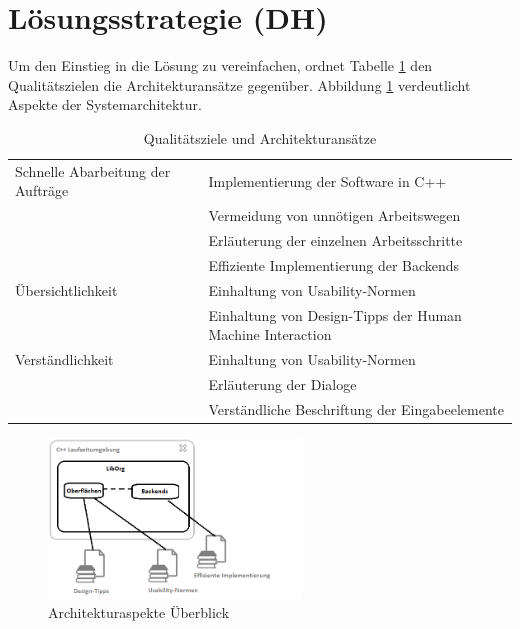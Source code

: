\section{Lösungsstrategie (DH)}
Um den Einstieg in die Lösung zu vereinfachen, ordnet Tabelle \ref{tab:QualitätszieleUndArchitekturansätze} den Qualitätszielen die Architekturansätze gegenüber. Abbildung \ref{fig:Loesungsansaetze_Ueberblick} verdeutlicht Aspekte der Systemarchitektur.
\begin{table}[htb]
	\centering
	\caption{Qualitätsziele und Architekturansätze}
	\label{tab:QualitätszieleUndArchitekturansätze}	
		\begin{tabular}{|l|l|}
		\hline
		Schnelle Abarbeitung der Aufträge & \textbullet{} Implementierung der Software in C++ \\
		 & \textbullet{} Vermeidung von unnötigen Arbeitswegen \\ 
		 & \textbullet{} Erläuterung der einzelnen Arbeitsschritte \\ 
		 & \textbullet{} Effiziente Implementierung der Backends \\ \hline
		Übersichtlichkeit & \textbullet{} Einhaltung von Usability-Normen \\ 
		 & \textbullet{} Einhaltung von Design-Tipps der Human Machine Interaction \\ \hline
		Verständlichkeit & \textbullet{} Einhaltung von Usability-Normen \\ 
		 & \textbullet{} Erläuterung der Dialoge \\
		 & \textbullet{} Verständliche Beschriftung der Eingabeelemente \\ \hline
		\end{tabular}
\end{table}
\begin{figure}[htb]
	\centering
		\includegraphics[width=0.60\textwidth]{figures/Loesungsansaetze_Ueberblick.png}
	\caption{Architekturaspekte Überblick}
	\label{fig:Loesungsansaetze_Ueberblick}
\end{figure}


